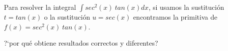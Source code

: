 Para resolver la integral 
$\displaystyle\int sec^2 (x) \ tan(x) dx$, si usamos la sustituci\'on \\ $t = tan(x)$ o la sustituci\'on $u = sec(x)$ encontramos la primitiva de $f(x)= sec^2 (x) \ tan(x)$. 
\begin{center}
?`por qu\'e obtiene resultados correctos y diferentes? 
\end{center}


%
%

\newpage

